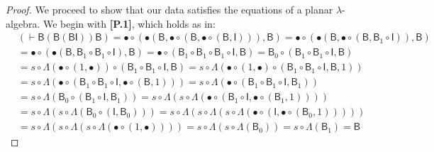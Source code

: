 \documentclass{llncs}
\begin{document}
\begin{proof}
  We proceed to show that our data satisfies the equations of a planar $\lambda$-algebra. We begin with {\bf [P.1]}, which holds as in:
    \begin{align*}
      & (\vdash \mathsf{B}(\mathsf{B}(\mathsf{BI}))\mathsf{B})
        = \bullet \circ (\bullet (\mathsf{B}, \bullet \circ (\mathsf{B}, \bullet \circ (\mathsf{B},\mathsf{I}))), \mathsf{B})
        = \bullet \circ (\bullet (\mathsf{B}, \bullet \circ (\mathsf{B}, \mathsf{B}_1 \circ \mathsf{I})), \mathsf{B})
      \\&= \bullet \circ (\bullet (\mathsf{B}, \mathsf{B}_1 \circ \mathsf{B}_1 \circ \mathsf{I}), \mathsf{B})
      = \bullet \circ (\mathsf{B}_1 \circ \mathsf{B}_1 \circ \mathsf{B}_1 \circ \mathsf{I}, \mathsf{B})
      = \mathsf{B}_0 \circ (\mathsf{B}_1 \circ \mathsf{B}_1 \circ \mathsf{I},\mathsf{B})
      \\&= s \circ \Lambda(\bullet \circ (1,\bullet)) \circ (\mathsf{B}_1 \circ \mathsf{B}_1 \circ \mathsf{I},\mathsf{B})
      = s \circ \Lambda(\bullet \circ (1,\bullet) \circ (\mathsf{B}_1 \circ \mathsf{B}_1 \circ  \mathsf{I},\mathsf{B},1))
      \\&= s \circ \Lambda(\bullet \circ (\mathsf{B}_1 \circ \mathsf{B}_1 \circ \mathsf{I}, \bullet \circ (\mathsf{B},1)))
      = s \circ \Lambda(\bullet \circ (\mathsf{B}_1 \circ \mathsf{B}_1 \circ \mathsf{I}, \mathsf{B}_1))
      \\&= s \circ \Lambda(\mathsf{B}_0 \circ (\mathsf{B}_1 \circ \mathsf{I} ,\mathsf{B}_1))
      = s \circ \Lambda(s \circ \Lambda(\bullet \circ (\mathsf{B}_1 \circ \mathsf{I}, \bullet \circ (\mathsf{B}_1,1))))
      \\&= s \circ \Lambda(s \circ \Lambda(\mathsf{B}_0 \circ (\mathsf{I}, \mathsf{B}_0)))
      = s \circ \Lambda(s \circ \Lambda(s \circ \Lambda(\bullet \circ (\mathsf{I},\bullet \circ (\mathsf{B}_0,1)))))
      \\&= s \circ \Lambda(s \circ \Lambda(s \circ \Lambda(\bullet \circ (1,\bullet))))
       = s \circ \Lambda(s \circ \Lambda(\mathsf{B}_0))
      = s \circ \Lambda(\mathsf{B}_1)
      = \mathsf{B}
    \end{align*}

\end{proof}
\end{document}
